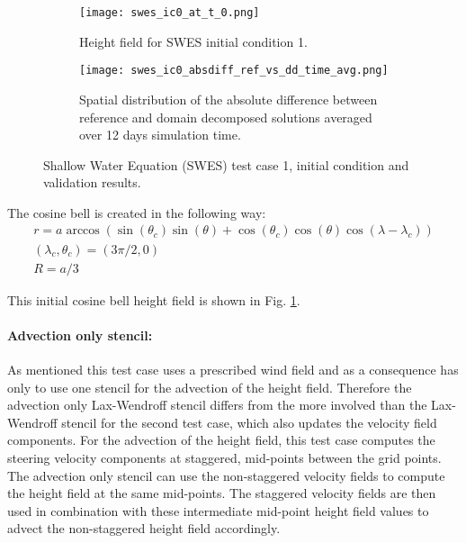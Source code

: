 \begin{figure}[ht]
\begin{subfigure}[t]{.45\textwidth}
  \texttt{[image: swes\_ic0\_at\_t\_0.png]}
  \caption{Height field for SWES initial condition 1.}
  \label{fig:swes_ic0}
\end{subfigure} \hfill
\begin{subfigure}[t]{.45\textwidth}
  \texttt{[image: swes\_ic0\_absdiff\_ref\_vs\_dd\_time\_avg.png]}
  \caption{Spatial distribution of the absolute difference between reference and domain decomposed solutions averaged over 12 days simulation time.}
  \label{fig:swes_absdiff}
\end{subfigure}
\caption{Shallow Water Equation (SWES) test case 1, initial condition and validation results.}
\label{fig:swes_ic0_graphs}
\end{figure}

The cosine bell is created in the following way:
\begin{equation}
\label{eq:swes_cosine_bell}
\begin{split}
r = a \arccos \left( \sin \left( \theta_c \right) \sin \left( \theta \right) + \cos \left( \theta_c \right) \cos \left( \theta \right) \cos \left( \lambda - \lambda_c \right) \right)
\\
\left( \lambda_c, \theta_c \right) = \left( 3 \pi / 2, 0 \right)
\\
R = a / 3
\end{split}
\end{equation}

This initial cosine bell height field is shown in Fig. \ref{fig:swes_ic0}.


\paragraph{Advection only stencil:}

As mentioned this test case uses a prescribed wind field and as a consequence has only to use one stencil for the advection of the height field.
Therefore the advection only Lax-Wendroff stencil differs from the more involved than the Lax-Wendroff stencil for the second test case, which also updates the velocity field components.
For the advection of the height field, this test case computes the steering velocity components at staggered, mid-points between the grid points.
The advection only stencil can use the non-staggered velocity fields to compute the height field at the same mid-points.
The staggered velocity fields are then used in combination with these intermediate mid-point height field values to advect the non-staggered height field accordingly.

